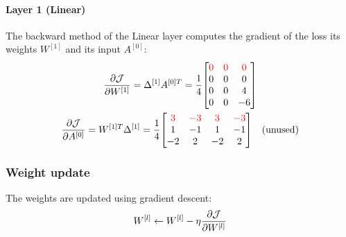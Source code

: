 \paragraph{Layer 1 (Linear)} The backward method of the Linear layer computes the gradient of the loss \wrt its weights $W^{[1]}$ and its input $A^{[0]}$:
\begin{gather*}
    \pdv{\J}{W^{[1]}} = \Delta^{[1]} A^{[0]T} = \frac{1}{4} \mqty[
        \color{red} 0 & \color{red} 0 & \color{red} 0 \\
        0 & 0 & 0 \\
        0 & 0 & 4 \\
        0 & 0 & -6
    ]\\
    \pdv{\J}{A^{[0]}} = W^{[1]T} \Delta^{[1]} = \frac{1}{4} \mqty[
        \color{red} 3 & \color{red} -3 & \color{red} 3 & \color{red} -3 \\
        1 & -1 & 1 & -1 \\
        -2 & 2 & -2 & 2
    ] \quad \text{(unused)}
\end{gather*}

\subsubsection{Weight update}

The weights are updated using gradient descent:
\begin{equation*}
    W^{[l]} \gets W^{[l]} - \eta \pdv{\mathcal{J}}{W^{[l]}} \\
\end{equation*}

